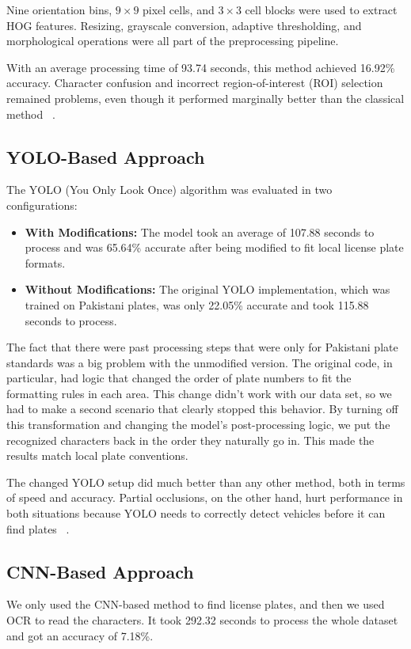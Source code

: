 \documentclass[runningheads]{llncs}
\begin{document}
Nine orientation bins, $9\times9$ pixel cells, and $3\times3$ cell blocks were used to extract HOG features. Resizing, grayscale conversion, adaptive thresholding, and morphological operations were all part of the preprocessing pipeline.

With an average processing time of 93.74 seconds, this method achieved 16.92\% accuracy. Character confusion and incorrect region-of-interest (ROI) selection remained problems, even though it performed marginally better than the classical method ~\cite{SardhenduMishraHOG}.

\subsection{YOLO-Based Approach}

The YOLO (You Only Look Once) algorithm was evaluated in two configurations:

\begin{itemize}
    \item \textbf{With Modifications:} The model took an average of 107.88 seconds to process and was 65.64\% accurate after being modified to fit local license plate formats.
    
    \item \textbf{Without Modifications:} The original YOLO implementation, which was trained on Pakistani plates, was only 22.05\% accurate and took 115.88 seconds to process.
\end{itemize}

The fact that there were past processing steps that were only for Pakistani plate standards was a big problem with the unmodified version. The original code, in particular, had logic that changed the order of plate numbers to fit the formatting rules in each area. This change didn't work with our data set, so we had to make a second scenario that clearly stopped this behavior. By turning off this transformation and changing the model's post-processing logic, we put the recognized characters back in the order they naturally go in. This made the results match local plate conventions.

The changed YOLO setup did much better than any other method, both in terms of speed and accuracy. Partial occlusions, on the other hand, hurt performance in both situations because YOLO needs to correctly detect vehicles before it can find plates ~\cite{usama2022vehicle}.


\subsection{CNN-Based Approach}
We only used the CNN-based method to find license plates, and then we used OCR to read the characters. It took 292.32 seconds to process the whole dataset and got an accuracy of 7.18\%. 
\end{document}
